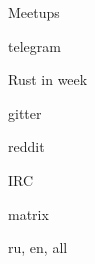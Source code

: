 \begin{frame}{\insertsubsection}
  Meetups

  telegram

  Rust in week

  gitter

  reddit

  IRC

  matrix

  ru, en, all

  \note {

  }

\end{frame}
